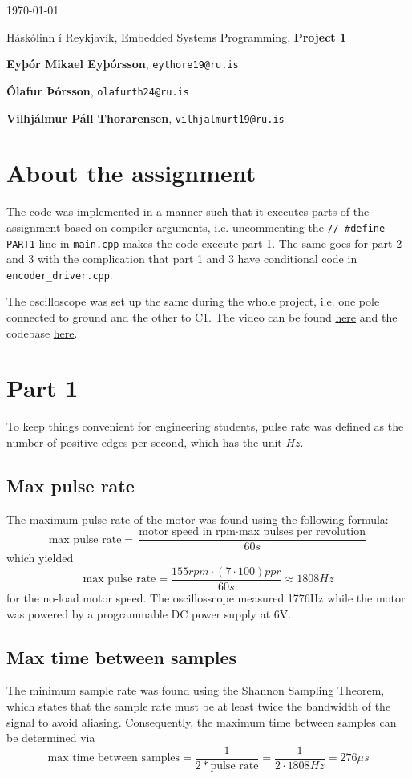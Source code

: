 \documentclass{article}
\begin{document}
\today \par
\vspace{.5cm}
\noindent Háskólinn í Reykjavík, Embedded Systems Programming, \textbf{Project 1} \par
\noindent \textbf{Eyþór Mikael Eyþórsson}, \texttt{eythore19@ru.is}\par
\noindent \textbf{Ólafur Þórsson}, \texttt{olafurth24@ru.is}\par
\noindent \textbf{Vilhjálmur Páll Thorarensen}, \texttt{vilhjalmurt19@ru.is}\par

\section*{About the assignment}
The code was implemented in a manner such that it executes parts of the assignment based
on compiler arguments, i.e. uncommenting the \texttt{// \#define PART1} line in
\texttt{main.cpp} makes the code execute part 1. The same goes for part 2 and 3 with the
complication that part 1 and 3 have conditional code in \texttt{encoder\_driver.cpp}.

The oscilloscope was set up the same during the whole project, i.e. one pole connected to
ground and the other to C1.
The video can be found \href{https://youtu.be/15Uzd80X8S8}{here} and the codebase
\href{https://github.com/mikaeleythor/embe-project-1}{here}.


\section*{Part 1}
To keep things convenient for engineering students, pulse rate was defined as the number
of positive edges per second, which has the unit $Hz$.
\subsection*{Max pulse rate}
The maximum pulse rate of the motor was found using the following formula: \[
	\text{max pulse rate} = \frac{\text{motor speed in rpm} \cdot \text{max pulses per
			revolution}}{60s}
\] which yielded \[
	\text{max pulse rate} = \frac{155rpm \cdot (7\cdot 100)ppr}{60s} \approx 1808Hz
\] for the no-load motor speed. The oscillosscope measured 1776Hz while the motor was
powered by a programmable DC power supply at 6V.

\subsection*{Max time between samples}
The minimum sample rate was found using the Shannon Sampling Theorem, which
states that the sample rate must be at least twice the bandwidth of the signal to avoid
aliasing. Consequently, the maximum time between samples can be determined via \[
	\text{max time between samples} = \frac{1}{2*\text{pulse rate}} =
	\frac{1}{2\cdot1808Hz} = 276\mu s
\]
\end{document}
